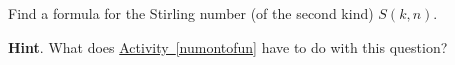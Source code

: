\documentclass{book}
\begin{document}
\setcounter{cpjt}{231}
\addtocounter{cpjt}{-1}
\begin{activity}\label{act_stirlingpie}
\hypertarget{p-1228}{}%
Find a formula for the Stirling number (of the second kind) \(S(k,n)\).%
\par\smallskip%
\noindent\textbf{Hint}.\hypertarget{hint-150}{}\quad%
\hypertarget{p-1229}{}%
What does \hyperref[numontofun]{Activity~\ref{numontofun}} have to do with this question?%
\par\smallskip%
\noindent\end{activity}

\clearpage
\end{document}
